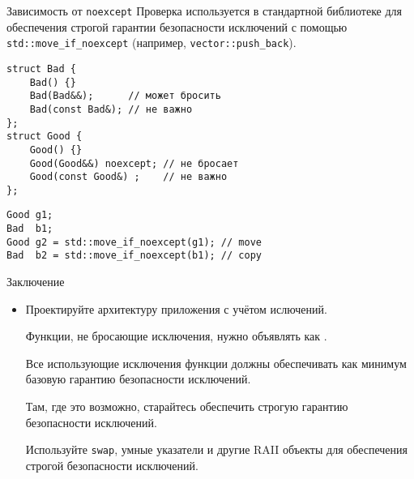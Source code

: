 \documentclass{beamer}
\begin{document}

\begin{frame}[fragile]{Зависимость от \texttt{noexcept}}
    Проверка  используется в стандартной 
    библиотеке для обеспечения строгой гарантии безопасности исключений с помощью
    \texttt{std::move\_if\_noexcept} (например, \texttt{vector::push\_back}).

\begin{lstlisting}
struct Bad {
    Bad() {}
    Bad(Bad&&);      // может бросить
    Bad(const Bad&); // не важно
};
struct Good {
    Good() {}
    Good(Good&&) noexcept; // не бросает
    Good(const Good&) ;    // не важно
};
\end{lstlisting}
\begin{lstlisting}
Good g1;
Bad  b1;
Good g2 = std::move_if_noexcept(g1); // move
Bad  b2 = std::move_if_noexcept(b1); // copy
\end{lstlisting}
    
\end{frame}

\begin{frame}[fragile]{Заключение}
    \begin{itemize}
        \item Проектируйте архитектуру приложения с учётом ислючений.
        
        \pitem Функции, не бросающие исключения, нужно  объявлять
        как .
        
        \pitem Все использующие исключения функции  должны
        обеспечивать как минимум базовую  гарантию безопасности исключений.
        
        \pitem Там, где это возможно, старайтесь обеспечить 
        строгую гарантию безопасности исключений.
        
        \pitem Используйте \texttt{swap}, умные указатели и другие
        RAII объекты  для обеспечения строгой безопасности исключений.
    \end{itemize}
\end{frame}
\end{document}
